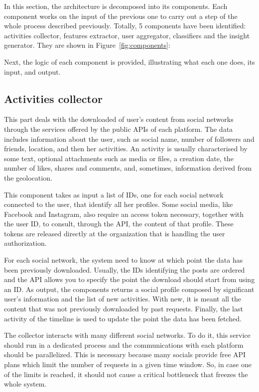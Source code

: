 In this section, the architecture is decomposed into its components. Each component works on the input of the previous one to carry out a step of the whole process described previously.
Totally, 5 components have been identified: activities collector, features extractor, user aggregator, classifiers and the insight generator. They are shown in Figure~\ref{fig:components}:


Next, the logic of each component is provided, illustrating what each one does, its input, and output.

\subsection{Activities collector}
This part deals with the downloaded of user's content from social networks through the services offered by the public APIs of each platform.
The data includes information about the user, such as social name, number of followers and friends, location, and then her activities.
An activity is usually characterised by some text, optional attachments such as media or files, a creation date, the number of likes, shares and comments, and, sometimes, information derived from the geolocation.

This component takes as input a list of IDs, one for each social network connected to the user, that identify all her profiles. Some social media, like Facebook and Instagram, also require an access token necessary, together with the user ID, to consult, through the API, the content of that profile.
These tokens are released directly at the organization that is handling the user authorization.

For each social network, the system need to know at which point the data has been previously downloaded. Usually, the IDs identifying the posts are ordered and the API allows you to specify the point the download should start from using an ID.
As output, the components returns a social profile composed by significant user's information and the list of new activities. With new, it is meant all the content that was not previously downloaded by past requests.
Finally, the last activity of the timeline is used to update the point the data has been fetched.

The collector interacts with many different social networks. To do it, this service should run in a dedicated process and the communications with each platform should be parallelized.
This is necessary because many socials provide free API plans which limit the number of requests in a given time window. So, in case one of the limits is reached, it should not cause a critical bottleneck that freezes the whole system.


